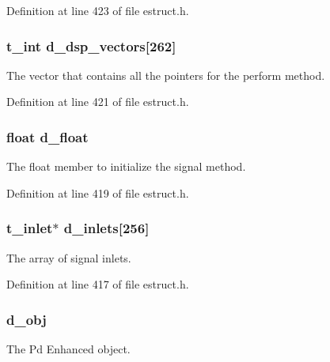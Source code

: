 Definition at line 423 of file estruct.\-h.

\hypertarget{struct__edspobj_a6c9361ef0820022b61cd7894d641c029}{
\subsubsection[{d\-\_\-dsp\-\_\-vectors}]{\setlength{\rightskip}{0pt plus 5cm}t\-\_\-int d\-\_\-dsp\-\_\-vectors\mbox{[}262\mbox{]}}}\label{struct__edspobj_a6c9361ef0820022b61cd7894d641c029}
The vector that contains all the pointers for the perform method. 

Definition at line 421 of file estruct.\-h.

\hypertarget{struct__edspobj_aaa8c8ad1277112523fd01b5058e0fcb5}{
\subsubsection[{d\-\_\-float}]{\setlength{\rightskip}{0pt plus 5cm}float d\-\_\-float}}\label{struct__edspobj_aaa8c8ad1277112523fd01b5058e0fcb5}
The float member to initialize the signal method. 

Definition at line 419 of file estruct.\-h.

\hypertarget{struct__edspobj_af58ea0594fc028861443f36dc2d1ebf4}{
\subsubsection[{d\-\_\-inlets}]{\setlength{\rightskip}{0pt plus 5cm}t\-\_\-inlet$\ast$ d\-\_\-inlets\mbox{[}256\mbox{]}}}\label{struct__edspobj_af58ea0594fc028861443f36dc2d1ebf4}
The array of signal inlets. 

Definition at line 417 of file estruct.\-h.

\hypertarget{struct__edspobj_a987087c8b9df0fa2ae99bd44ab53dab9}{
\subsubsection[{d\-\_\-obj}]{ d\-\_\-obj}}\label{struct__edspobj_a987087c8b9df0fa2ae99bd44ab53dab9}
The Pd Enhanced object. 

